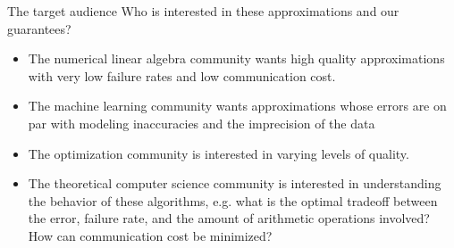 \documentclass[xcolor=x11names,compress,ignorenonframetext]{beamer}
\renewcommand{\(}{\begin{columns}}
\renewcommand{\)}{\end{columns}}
\newcommand{\<}[1]{\begin{column}{#1}}
\renewcommand{\>}{\end{column}}
\begin{document}
\begin{frame}{The target audience}
 Who is interested in these approximations and our guarantees?
 \begin{itemize}
  \item The {\color{dgreen} numerical linear algebra community} wants high quality approximations
  with very low failure rates and low communication cost.
  \item The {\color{dgreen} machine learning community} wants approximations whose errors are on par
  with modeling inaccuracies and the imprecision of the data
  \item The {\color{dgreen} optimization community} is interested in varying levels of quality.
  \item The {\color{dgreen} theoretical computer science community} is interested in understanding the
  behavior of these algorithms, e.g. what is the optimal tradeoff between the error, failure rate,
  and the amount of arithmetic operations involved? How can communication cost be minimized?
 \end{itemize}
\end{frame}

\end{document}
